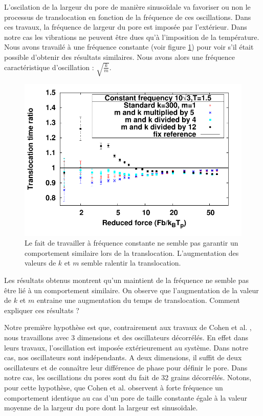 L'oscilation de la largeur du pore de manière sinusoïdale va favoriser ou non le processus de translocation en fonction de la fréquence de ces oscillations. Dans ces travaux, la fréquence de largeur du pore est imposée par l'extérieur. Dans notre cas les vibrations ne peuvent être dues qu'à l'imposition de la température. Nous avons travailé à une fréquence constante (voir figure \ref{influencefrequencecarac}) pour voir s'il était possible d'obtenir des résultats similaires. Nous avons alors une fréquence caractéristique d'oscillation : $\sqrt{\frac{k}{m}}$.







\begin{figure}[H]
\begin{center}
\includegraphics[width=\textwidth]{compsamefrequency.pdf} 

\caption[Influence de la fréquence des vibrations]{Le fait de travailler à fréquence constante ne semble pas garantir un comportement similaire lors de la translocation. L'augmentation des valeurs de $k$ et $m$ semble ralentir la translocation.}
\label{influencefrequencecarac}
\end{center}
\end{figure}

Les résultats obtenus montrent qu'un maintient de la fréquence ne semble pas être lié à un comportement similaire. On observe que l'augmentation de la valeur de $k$ et $m$ entraine une augmentation du temps de translocation. Comment expliquer ces résultats ?

Notre première hypothèse est que, contrairement aux travaux de Cohen et al. \cite{Cohen2011}, nous travaillons avec 3 dimensions et des oscillateurs décorrélés. En effet dans leurs travaux, l'oscillation est imposée extérieurement au système. Dans notre cas, nos oscillateurs sont indépendants. A deux dimensions, il suffit de deux oscillateurs et de connaître leur différence de phase pour définir le pore. Dans notre cas, les oscillations du pores sont du fait de 32 grains décorrélés. Notons, pour cette hypothèse, que Cohen et al. \cite{Cohen2011} observent à forte fréquence un comportement identique au cas d'un pore de taille constante égale à la valeur moyenne de la largeur du pore dont la largeur est sinusoïdale.

